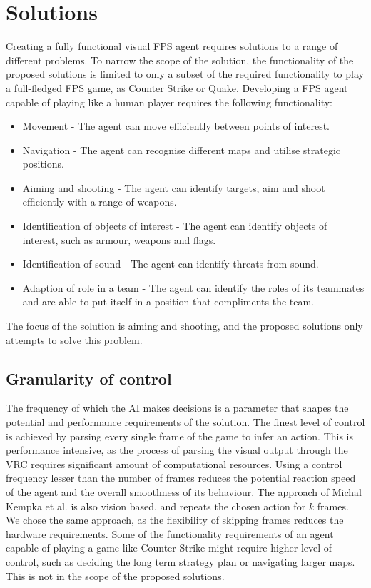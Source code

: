 
\section{Solutions}
\label{sec:solutions}
Creating a fully functional visual FPS agent requires solutions to a range of different problems. To narrow the scope of the solution, the functionality of the proposed solutions is limited to only a subset of the required functionality to play a full-fledged FPS game, as Counter Strike or Quake. Developing a FPS agent capable of playing like a human player requires the following functionality:
\begin{itemize}
\item Movement - The agent can move efficiently between points of interest.
\item Navigation - The agent can recognise different maps and utilise strategic positions.
\item Aiming and shooting - The agent can identify targets, aim and shoot efficiently with a range of weapons.
\item Identification of objects of interest - The agent can identify objects of interest, such as armour, weapons and flags.
\item Identification of sound - The agent can identify threats from sound.
\item Adaption of role in a team - The agent can identify the roles of its teammates and are able to put itself in a position that compliments the team.
\end{itemize}
The focus of the solution is aiming and shooting, and the proposed solutions only attempts to solve this problem.

\subsection{Granularity of control}
The frequency of which the AI makes decisions is a parameter that shapes the potential and performance requirements of the solution. The finest level of control is achieved by parsing every single frame of the game to infer an action. This is performance intensive, as the process of parsing the visual output through the VRC requires significant amount of computational resources. Using a control frequency lesser than the number of frames reduces the potential reaction speed of the agent and the overall smoothness of its behaviour. The approach of Michal Kempka et al.\cite{vizdoom} is also vision based, and repeats the chosen action for $k$ frames. We chose the same approach, as the flexibility of skipping frames reduces the hardware requirements.
Some of the functionality requirements of an agent capable of playing a game like Counter Strike might require higher level of control, such as deciding the long term strategy plan or navigating larger maps. This is not in the scope of the proposed solutions.


